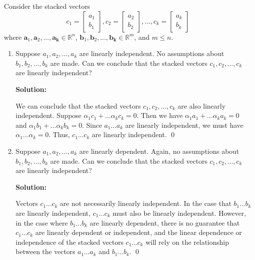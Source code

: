 Consider the stacked vectors
$$
	c_1=\left[\begin{array}{l}
			a_1 \\
			b_1
		\end{array}\right], c_2=\left[\begin{array}{l}
			a_2 \\
			b_2
		\end{array}\right], \ldots, c_k=\left[\begin{array}{l}
			a_k \\
			b_k
		\end{array}\right]
$$
where $\mathbf{a}_1, \mathbf{a}_2, \ldots, \mathbf{a}_{\mathbf{k}} \in
	\mathbb{R}^n$,
$\mathbf{b}_1, \mathbf{b}_2, \ldots,
	\mathbf{b}_{\mathbf{k}} \in \mathbb{R}^m$, and $m \leq n$.

\begin{enumerate}[label=(\alph*)]
	\item Suppose $a_1, a_2, \ldots, a_k$ are linearly independent. No
	      assumptions about $b_1, b_2, \ldots, b_k$ are made. Can we conclude that
	      the stacked vectors
	      $c_1, c_2, \ldots, c_k$ are linearly independent?

	      \par \textbf{Solution:}
	      \par We can conclude that the stacked vectors $c_1, c_2, \ldots, c_k$
	      are also linearly independent. Suppose $\alpha_1 c_1 + \ldots
		      \alpha_kc_k = 0$. Then we have $\alpha_1 a_1 + \ldots \alpha_ka_k = 0$
	      and $\alpha_1 b_1 + \ldots \alpha_kb_k = 0$. Since $a_1 \ldots a_k$ are
	      linearly independent, we must have $\alpha_1 \ldots \alpha_k = 0$.
	      Thus, $c_1 \ldots c_k$ are linearly independent. \qed

	\item Suppose $a_1, a_2, \ldots, a_k$ are linearly dependent. Again, no
	      assumptions about $b_1, b_2, \ldots, b_k$ are made. Can we conclude that
	      the stacked vectors
	      $c_1, c_2, \ldots, c_k$ are linearly independent?

	      \par \textbf{Solution:}
	      \par Vectors $c_1 \ldots c_k$ are not necessarily linearly independent.
	      In the case that $b_1 \ldots b_k$ are linearly independent, $c_1
		      \ldots c_k$ must also be linearly independent. However, in the case
	      where $b_1 \ldots b_k$ are linearly dependent, there is no guarantee
	      that $c_1 \ldots c_k$ are linearly dependent or independent, and the
	      linear dependence or independence of the stacked vectors $c_1 \ldots
		      c_k$ will rely on the relationship between the vectors $a_1 \ldots
		      a_k$ and $b_1 \ldots b_k$. \qed


\end{enumerate}
